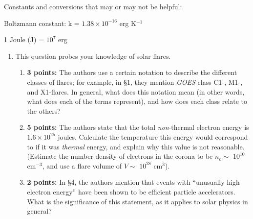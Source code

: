 \documentclass[12pt]{article}
\begin{document}
Constants and conversions that may or may not be helpful:
\begin{itemize*}
    \item Boltzmann constant: k = $1.38\times10^{-16}$ erg K$^{-1}$
    \item 1 Joule (J) = $10^7$ erg
\end{itemize*}

\begin{enumerate}
    \item This question probes your knowledge of solar flares.
        \begin{enumerate}
            \item \textbf{3 points:} The authors use a certain notation to
                describe the different classes of flares; for example, in
                \S 1, they mention \emph{GOES} class C1-, M1-, and X1-flares.
                In general, what does this notation mean
                (in other words, what does each of the terms represent),
                and how does each class relate to the others?

            \item \textbf{5 points:} The authors state that the total
                \emph{non}-thermal electron
                energy is $1.6\times10^{25}$ joules. Calculate the
                temperature this energy would correspond to if it was
                \emph{thermal} energy, and explain why this value is not
                reasonable. (Estimate the number density of electrons in the
                corona to be $n_e \sim$ $10^{10}$ cm$^{-3}$, and use a flare
                volume of $V \sim$ $10^{28}$ cm$^3$).

            \item \textbf{2 points:} In \S 4, the authors mention that events with ``unusually
                high electron energy'' have been shown to be efficient particle
                accelerators. What is the significance of this statement,
                as it applies to solar physics in general?

        \end{enumerate}
\end{enumerate}
\end{document}
